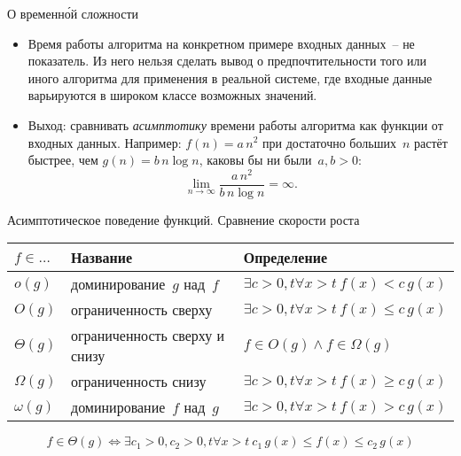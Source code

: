 \documentclass[landscape]{slides}
\begin{document}
\begin{slide}
  О временн\'{о}й сложности
  \begin{itemize}
    \item Время работы алгоритма на конкретном примере входных данных~-- не показатель. Из него нельзя сделать
      вывод о предпочтительности того или иного алгоритма для применения в реальной системе, где входные данные
      варьируются в широком классе возможных значений.
    \item Выход: сравнивать \emph{асимптотику} времени работы алгоритма как функции от входных данных.
      Например: $f(n)=a\,n^2$ при достаточно больших~$n$ растёт быстрее, чем $g(n)=b\,n\log n$, каковы бы ни были~$a,b>0$:
      \[
        \lim_{n \to \infty} \frac{a\,n^2}{b\,n\log n} = \infty .
      \]
  \end{itemize}
\end{slide}

\begin{slide}
  Асимптотическое поведение функций. Сравнение скорости роста
  \begin{center}
    \begin{tabular}{|l|l|l|}
      \hline
      $f\in\ldots$&
      Название&
      Определение
      \\[1ex]
      \hline
      \hline
      $o(g)$&
      доминирование~$g$ над~$f$&
      $\exists c>0, t \forall x>t\ f(x) < c\,g(x)$
      \\[1ex]
      \hline
      $O(g)$&
      ограниченность сверху&
      $\exists c>0, t \forall x>t\ f(x) \leqslant c\,g(x)$
      \\[1ex]
      \hline
      $\Theta(g)$&
      ограниченность сверху и снизу&
      $f\in O(g) \land f\in \Omega(g)$
      \\[1ex]
      \hline
      $\Omega(g)$&
      ограниченность снизу&
      $\exists c>0, t \forall x>t\ f(x) \geqslant c\,g(x)$
      \\[1ex]
      \hline
      $\omega(g)$&
      доминирование~$f$ над~$g$&
      $\exists c>0, t \forall x>t\ f(x) > c\,g(x)$
      \\[1ex]
      \hline
    \end{tabular}
  \end{center}
  \[
    f\in\Theta(g) \Leftrightarrow \exists c_1>0,c_2>0, t\forall x>t\ c_1\, g(x) \leqslant f(x) \leqslant c_2\,g(x)
  \]
\end{slide}
\end{document}
